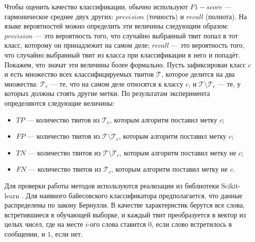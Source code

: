 Чтобы оценить качество классификации, обычно используют $F1-score$ --- гармоническое среднее двух
других: $precision$ (точность) и $recall$ (полнота). На языке вероятностей можно определить эти величины следующим образом: $precision$ --- это
вероятность того, что случайно выбранный твит попал в тот класс, которому он принадлежит
на самом деле; $recall$ --- это вероятность того, что случайно выбранный твит из класса
при классификации в него и попадёт. Покажем, что значат эти величины более формально.
Пусть зафиксирован класс $c$ и есть множество всех классифицируемых твитов $\mathcal{T}$,
которое делится на два множества: $\mathcal{T}_c$ --- те, что на самом деле относятся к классу $c$,
и $\mathcal{T}\setminus\mathcal{T}_c$ --- те, у которых должны стоять другие метки.
По результатам эксперимента определяются следующие величины:
  \begin{itemize}
    \setlength{\itemsep}{1pt}%
    \setlength{\parskip}{1pt}
  \item[ ] $TP$ --- количество твитов из $\mathcal{T}_с$, которым алгоритм поставил метку $c$; \nopagebreak
  \item[ ] $FP$ --- количество твитов из $\mathcal{T}\setminus\mathcal{T}_c$, которым алгоритм поставил метку $c$; \nopagebreak
  \item[ ] $TN$ --- количество твитов из $\mathcal{T}\setminus\mathcal{T}_c$, которым алгоритм поставил метку не $c$; \nopagebreak
  \item[ ] $FN$ --- количество твитов из $\mathcal{T}_c$, которым алгоритм поставил метку не $c$.
  \end{itemize}

Для проверки работы методов используются реализации из библиотеки
Scikit-learn \cite{scikit-learn}. Для наивного байесовского классификатора предполагается, что данные
распределены по закону Бернулли.
В качестве характеристик берутся все слова, встретившиеся в обучающей выборке,
и каждый твит преобразуется в вектор из целых чисел, где
на месте $i$-ого слова ставится $0$, если слово встретилось в сообщении, и $1$, если нет.


